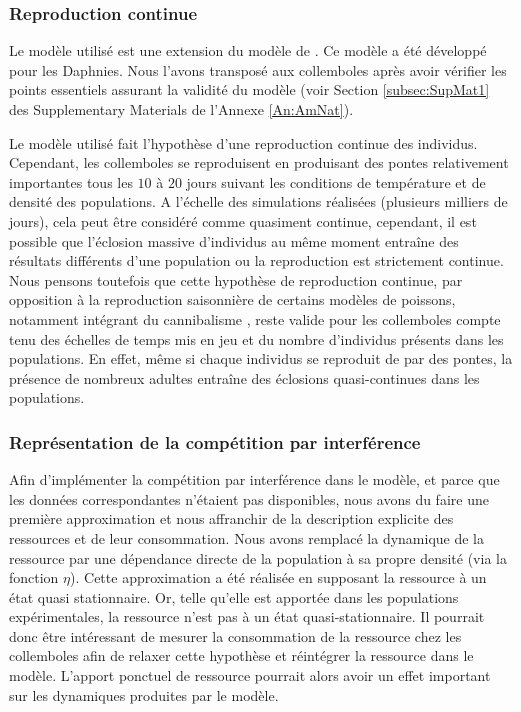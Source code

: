 \subsubsection{Reproduction continue}

Le modèle utilisé est une extension du modèle de \textcites{kooijman1984a}. Ce
modèle a été développé pour les Daphnies. Nous l'avons transposé aux collemboles
après avoir vérifier les points essentiels assurant la validité du modèle
(voir Section \ref{subsec:SupMat1} des Supplementary
Materials de l'Annexe \ref{An:AmNat}). 

Le modèle utilisé fait l'hypothèse d'une reproduction continue des individus.
Cependant, les collemboles se reproduisent en produisant des pontes
relativement importantes tous les $10$ à $20$ jours suivant les conditions de
température et de densité des populations. A l'échelle des simulations
réalisées (plusieurs milliers de jours), cela peut être considéré comme
quasiment continue, cependant, il est possible que l'éclosion massive
d'individus au même moment entraîne des résultats différents d'une population ou
la reproduction est strictement continue. Nous pensons toutefois que cette
hypothèse de reproduction continue, par opposition à la reproduction saisonnière
de certains modèles de poissons, notamment intégrant du cannibalisme
\autocites{claessen2000a,claessen2004a}, reste valide pour les collemboles
compte tenu des échelles de temps mis en jeu et du nombre d'individus présents
dans les populations. En effet, même si chaque individus se reproduit de par des
pontes, la présence de nombreux adultes entraîne des éclosions quasi-continues
dans les populations. 

\subsubsection{Représentation de la compétition par interférence}

Afin d'implémenter la compétition par interférence dans le modèle, et parce que
les données correspondantes n'étaient pas disponibles, nous avons du faire une
première approximation et nous affranchir de la description explicite des
ressources et de leur consommation. Nous avons remplacé la dynamique de la
ressource par une dépendance directe de la population à sa propre densité (via
la fonction $\eta$). Cette approximation a été réalisée en supposant la
ressource à un état quasi stationnaire. Or, telle qu'elle est apportée dans les
populations expérimentales, la ressource n'est pas à un état quasi-stationnaire.
Il pourrait donc être intéressant de mesurer la consommation de la ressource
chez les collemboles afin de relaxer cette hypothèse et réintégrer la ressource
dans le modèle. L'apport ponctuel de ressource pourrait alors avoir un effet
important sur les dynamiques produites par le modèle. 


